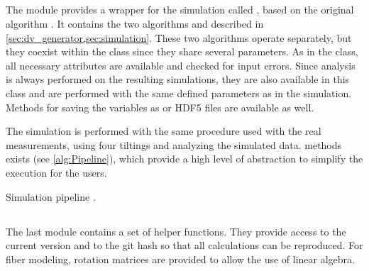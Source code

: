 \subsection{}
%
The  module provides a wrapper for the simulation called , based on the original algorithm \cite{Dohmen2015,Lucksch2016}.
It contains the two algorithms  and  described in \cref{sec:dv_generator,sec:simulation}.
These two algorithms operate separately, but they coexist within the class since they share several parameters.
As in the  class, all necessary attributes are available and checked for input errors.
Since analysis is always performed on the resulting simulations, they are also available in this class and are performed with the same defined parameters as in the simulation.
Methods for saving the variables as  or \ac{HDF5} files are available as well.
\par
%
The simulation is performed with the same procedure used with the real measurements, using four tiltings and analyzing the simulated data.
 methods exists (see \cref{alg:Pipeline}), which provide a high level of abstraction to simplify the execution for the users.
%
\begin{lstfloat}[!tb]
\centering
\scalebox{0.75}{
\begin{minipage}{\the\textwidth}

\end{minipage}}
\caption[]{Simulation pipeline .}
\label{alg:Pipeline}
\end{lstfloat}
%
%
%
\subsection{}
%
The last module contains a set of helper functions.
They provide access to the current version and  to the git hash so that all calculations can be reproduced.
For fiber modeling, rotation matrices are provided to allow the use of linear algebra.
%
%
%
